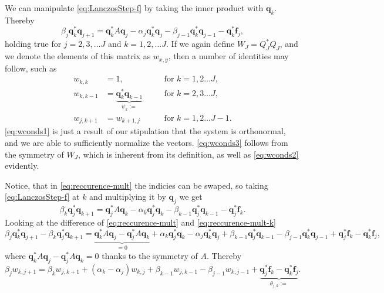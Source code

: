 \documentclass{article}
\begin{document}
	We can manipulate \autoref{eq:LanczosStep-f} by taking the inner product with $\textbf{q}_k$. Thereby
	\begin{equation}\label{eq:reccurence-mult}
		\beta_j\mathbf{q}_k^*\mathbf{q}_{j+1}=\mathbf{q}_k^*A\mathbf{q}_j-\alpha_j\mathbf{q}_k^*\mathbf{q}_j-\beta_{j-1}\mathbf{q}_k^*\mathbf{q}_{j-1} - \mathbf{q}_k^*\textbf{f}_j,
	\end{equation}
	holding true for $j=2,3,\dots J$ and $k=1,2, \dots J$. If we again define $W_J = Q_J^\ast Q_J$, and we denote the elements of this matrix as $w_{x,y}$, then a number of identities may follow, such as 
	\begin{align}
		w_{k,k} &=  1, \quad&&\mathrm{for}\,\, k = 1,2 \dots J\label{eq:wconds1}, \\
		w_{k,k-1} &= \underbrace{\textbf{q}_k^\ast \textbf{q}_{k-1}}_{\psi_k := } \quad&&\mathrm{for}\,\, k = 2,3 \dots J\label{eq:wconds2}, \\
		w_{j,k+1} &=  w_{k+1, j}\quad&&\mathrm{for}\,\, k = 1,2 \dots J-1\label{eq:wconds3}.
	\end{align}
	\autoref{eq:wconds1} is just a result of our stipulation that the system is orthonormal, and we are able to sufficiently normalize the vectors. \autoref{eq:wconds3} follows from the symmetry of $W_{J}$, which is inherent from its definition, as well as \autoref{eq:wconds2} evidently.
	
	Notice, that in \autoref{eq:reccurence-mult} the indicies can be swaped, so taking \autoref{eq:LanczosStep-f} at $k$ and multiplying it by $\textbf{q}_{j}$ we get
	\begin{equation}\label{eq:reccurence-mult-k}
		\beta_k\mathbf{q}_j^*\mathbf{q}_{k+1}=\mathbf{q}_j^*A\mathbf{q}_k-\alpha_k\mathbf{q}_j^*\mathbf{q}_k-\beta_{k-1}\mathbf{q}_j^*\mathbf{q}_{k-1} - \mathbf{q}_j^*\textbf{f}_k.
	\end{equation}
	Looking at the difference of \autoref{eq:reccurence-mult} and \autoref{eq:reccurence-mult-k}
	\begin{equation}
		\beta_j\mathbf{q}_k^*\mathbf{q}_{j+1} - \beta_k\mathbf{q}_j^*\mathbf{q}_{k+1}=\underbrace{\mathbf{q}_k^*A\mathbf{q}_j - \mathbf{q}_j^*A\mathbf{q}_k}_{=0} +
		\alpha_k\mathbf{q}_j^*\mathbf{q}_k - \alpha_j\mathbf{q}_k^*\mathbf{q}_j + \beta_{k-1}\mathbf{q}_j^*\mathbf{q}_{k-1} - \beta_{j-1}\mathbf{q}_k^*\mathbf{q}_{j-1} + \mathbf{q}_j^*\textbf{f}_k  - \mathbf{q}_k^*\textbf{f}_j,
	\end{equation}
	where $\mathbf{q}_k^*A\mathbf{q}_j - \mathbf{q}_j^*A\mathbf{q}_k = 0$ thanks to the symmetry of $A$. Thereby
	\begin{equation}\label{eq:w-update}
		\beta_j w_{k,j+1} = 
		\beta_k w_{j,k+1} + \left(\alpha_k - \alpha_j\right) w_{k,j} + \beta_{k-1} w_{j, k-1} - \beta_{j-1} w_{k,j-1} + \underbrace{\mathbf{q}_j^*\textbf{f}_k-\mathbf{q}_k^*\textbf{f}_j}_{\theta_{j,k} 
		:=}.
	\end{equation}
	 
\end{document}
